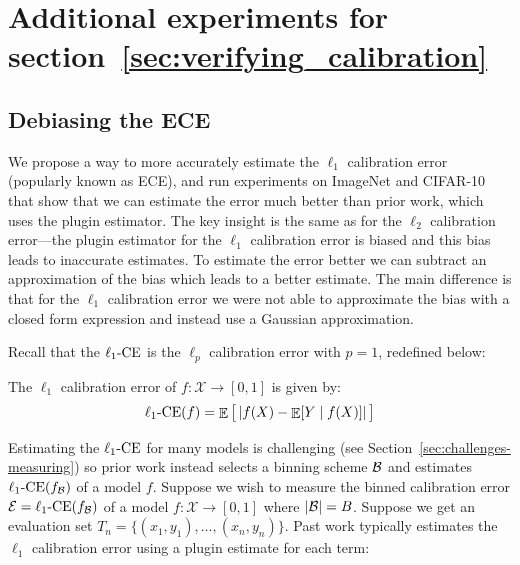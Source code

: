 \newpage

\newcommand{\lonece}[0]{\ensuremath{\ell_1\textup{-CE}}}
\newcommand{\loneerror}[0]{\ensuremath{\mathcal{E}}}
\newcommand{\pluginLoneEst}[0]{\ensuremath{\hat{\mathcal{E}}_{\textup{pl}}}}
\newcommand{\debiasedLoneEst}[0]{\ensuremath{\hat{\mathcal{E}}_{\textup{db}}}}

\section{Additional experiments for section~\ref{sec:verifying_calibration}}
\label{sec:verifying_calibration_appendix_experiments}

\subsection{Debiasing the ECE}
\label{sec:debiasing_ece_experiments}

We propose a way to more accurately estimate the $\ell_1$ calibration error (popularly known as ECE), and run experiments on ImageNet and CIFAR-10 that show that we can estimate the error much better than prior work, which uses the plugin estimator. The key insight is the same as for the $\ell_2$ calibration error---the plugin estimator for the $\ell_1$ calibration error is biased and this bias leads to inaccurate estimates. To estimate the error better we can subtract an approximation of the bias which leads to a better estimate. The main difference is that for the $\ell_1$ calibration error we were not able to approximate the bias with a closed form expression and instead use a Gaussian approximation.

Recall that the $\lonece{}$ is the $\ell_p{}$ calibration error with $p=1$, redefined below:

\begin{definition}
The $\ell_1$ calibration error of $f : \mathcal{X} \to [0, 1]$ is given by:
\begin{align}
\lonece(f) = \expect\big[ \left|f(X) - \expect[Y \mid f(X)] \right| \big]
\end{align}
\end{definition}

Estimating the $\lonece{}$ for many models is challenging (see Section~\ref{sec:challenges-measuring}) so prior work instead selects a binning scheme $\mathcal{B}{}$ and estimates $\lonece(f_{\bins{}})$ of a model $f$. Suppose we wish to measure the binned calibration error $\loneerror{} = \lonece(f_{\bins{}})$ of a model $f : \mathcal{X} \to [0, 1]$ where $|\mathcal{B}{}| = B$. Suppose we get an evaluation set $T_n = \{(x_1, y_1), \dots, (x_n, y_n)\}$. Past work typically estimates the $\ell_1$ calibration error using a plugin estimate for each term:

